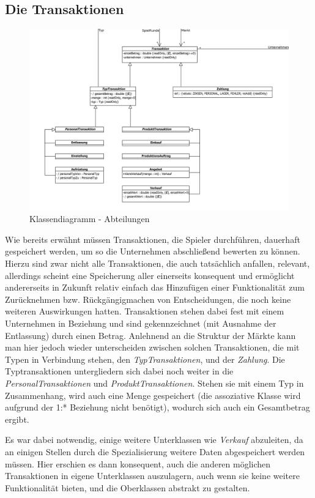 \subsection{Die Transaktionen}
\begin{figure}[htb]
     \centering
     \includegraphics[width=\textwidth]{30_Fachkonzept/20_Entwurf/transaktion}
     \caption{Klassendiagramm - Abteilungen}
     \label{img:fachkonzept-entwurf-abteilung}
\end{figure}
Wie bereits erwähnt müssen Transaktionen, die Spieler durchführen, dauerhaft gespeichert werden, um so die Unternehmen abschließend bewerten zu können. Hierzu sind zwar nicht alle Transaktionen, die auch tatsächlich anfallen, relevant, allerdings scheint eine Speicherung aller einerseits konsequent und ermöglicht andererseits in Zukunft relativ einfach das Hinzufügen einer Funktionalität zum Zurücknehmen bzw. Rückgängigmachen von Entscheidungen, die noch keine weiteren Auswirkungen hatten. Transaktionen stehen dabei fest mit einem Unternehmen in Beziehung und sind gekennzeichnet (mit Ausnahme der Entlassung) durch einen Betrag. Anlehnend an die Struktur der Märkte kann man hier jedoch wieder unterscheiden zwischen solchen Transaktionen, die mit Typen in Verbindung stehen, den \textit{TypTransaktionen}, und der \textit{Zahlung}. Die Typtransaktionen untergliedern sich dabei noch weiter in die \textit{PersonalTransaktionen} und \textit{ProduktTransaktionen}. Stehen sie mit einem Typ in Zusammenhang, wird auch eine Menge gespeichert (die assoziative Klasse wird aufgrund der 1:* Beziehung nicht benötigt), wodurch sich auch ein Gesamtbetrag ergibt.

Es war dabei notwendig, einige weitere Unterklassen wie \textit{Verkauf} abzuleiten, da an einigen Stellen durch die Spezialisierung weitere Daten abgespeichert werden müssen. Hier erschien es dann konsequent, auch die anderen möglichen Transaktionen in eigene Unterklassen auszulagern, auch wenn sie keine weitere Funktionalität bieten, und die Oberklassen abstrakt zu gestalten.

